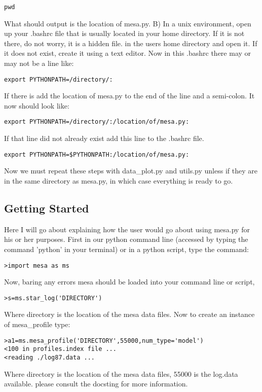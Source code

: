 \begin{verbatim}
pwd
\end{verbatim}

What should output is the location of mesa.py.
\newline
B) In a unix environment, open up your .bashrc file that is usually located in your home directory.  If it is not there, do not worry, it is a hidden file.
in the users home directory and open it.  If it does not exist, create it using a text editor.
Now in this .bashrc there may or may not be a line like:

\begin{verbatim}
export PYTHONPATH=/directory/:
\end{verbatim}

If there is add the location of mesa.py to the end of the line and a semi-colon.  It now should look like:

\begin{verbatim}
export PYTHONPATH=/directory/:/location/of/mesa.py:
\end{verbatim}

If that line did not already exist add this line to the .bashrc file.

\begin{verbatim}
export PYTHONPATH=$PYTHONPATH:/location/of/mesa.py:
\end{verbatim}

Now we must repeat these steps with data\_plot.py and utils.py unless if they are in the same directory as mesa.py, in which case everything is ready to go.


\subsection{Getting Started}
Here I will go about explaining how the user would go about using mesa.py for his or her purposes.
First in our python command line (accessed by typing the command 'python' in your terminal) or in a python script,
type the command:
\begin{verbatim}
>import mesa as ms
\end{verbatim}
Now, baring any errors mesa should be loaded into your command line or script, 
\begin{verbatim}
>s=ms.star_log('DIRECTORY')
\end{verbatim}
Where directory is the location of the mesa data files.
Now to create an instance of mesa\_profile type:
\begin{verbatim}
>a1=ms.mesa_profile('DIRECTORY',55000,num_type='model')
<100 in profiles.index file ...
<reading ./log87.data ...
\end{verbatim}
Where directory is the location of the mesa data files, 55000 is the log.data available. please consult the docsting for more information.
